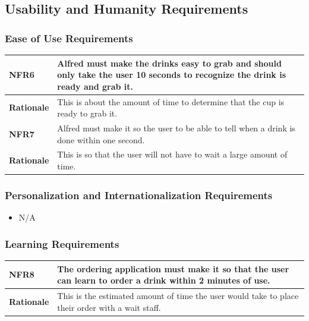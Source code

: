\documentclass [11pt]{article}
\begin{document}
\pagebreak

\subsection{Usability and Humanity Requirements} 

\subsubsection{Ease of Use Requirements}
\begin{longtable}{| p{ } | p{ } | }\hline 
\rowcolor{tableCell}\textbf{NFR6} & Alfred must make the drinks easy to grab and should only take the user 10 seconds to recognize the drink is ready and grab it. \\ \hline
\textbf{Rationale} & This is about the amount of time to determine that the cup is ready to grab it.\\ \hline 
\rowcolor{tableCell}\textbf{NFR7} & Alfred must make it so the user to be able to tell when a drink is done within one second. \\ \hline
\textbf{Rationale} & This is so that the user will not have to wait a large amount of time.\\ \hline 
\end{longtable}


\subsubsection{Personalization and Internationalization Requirements}
	\begin{itemize}
		\item N/A
	\end{itemize}

\subsubsection{Learning Requirements }

\begin{longtable}{| p{ } | p{ } | }\hline 
\rowcolor{tableCell}\textbf{NFR8} & The ordering application must make it so that the user can learn to order a drink within 2 minutes of use. \\ \hline
\textbf{Rationale} & This is the estimated amount of time the user would take to place their order with a wait staff.\\ \hline 
\end{longtable}
\end{document}
